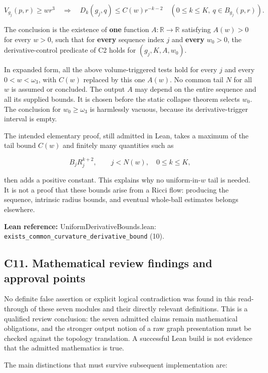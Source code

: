 \documentclass[
  letterpaper,
  11pt]{article}
\begin{document}
\[
 V_{g_j}(p,r)\geq wr^3
 \quad\Longrightarrow\quad
 D_k(g_j,q)\leq C(w)r^{-k-2}
 \quad(0\leq k\leq K,\ q\in B_{g_j}(p,r)).
\]

The conclusion is the existence of \textbf{one} function
\(A:\mathbb R\to\mathbb R\) satisfying \(A(w)>0\) for every \(w>0\),
such that for \textbf{every} sequence index \(j\) and \textbf{every}
\(w_0>0\), the derivative-control predicate of C2 holds for
\((g_j,K,A,w_0)\).

In expanded form, all the above volume-triggered tests hold for every
\(j\) and every \(0<w<\omega_3\), with \(C(w)\) replaced by this one
\(A(w)\). No common tail \(N\) for all \(w\) is assumed or concluded.
The output \(A\) may depend on the entire sequence and all its supplied
bounds. It is chosen before the static collapse theorem selects \(w_0\).
The conclusion for \(w_0\geq\omega_3\) is harmlessly vacuous, because
its derivative-trigger interval is empty.

The intended elementary proof, still admitted in Lean, takes a maximum
of the tail bound \(C(w)\) and finitely many quantities such as

\[
 B_jR_j^{k+2},\qquad j<N(w),\quad 0\leq k\leq K,
\]

then adds a positive constant. This explains why no uniform-in-\(w\)
tail is needed. It is not a proof that these bounds arise from a Ricci
flow: producing the sequence, intrinsic radius bounds, and eventual
whole-ball estimates belongs elsewhere.

\textbf{Lean reference:} UniformDerivativeBounds.lean:
{\small\texttt{exists\_\allowbreak{}common\_\allowbreak{}curvature\_\allowbreak{}derivative\_\allowbreak{}bound}}
(10).

\subsection{C11. Mathematical review findings and approval
points}\label{collapse-review}

No definite false assertion or explicit logical contradiction was found
in this read-through of these seven modules and their directly relevant
definitions. This is a qualified review conclusion: the seven admitted
claims remain mathematical obligations, and the stronger output notion
of a raw graph presentation must be checked against the topology
translation. A successful Lean build is not evidence that the admitted
mathematics is true.

The main distinctions that must survive subsequent implementation are:
\end{document}
